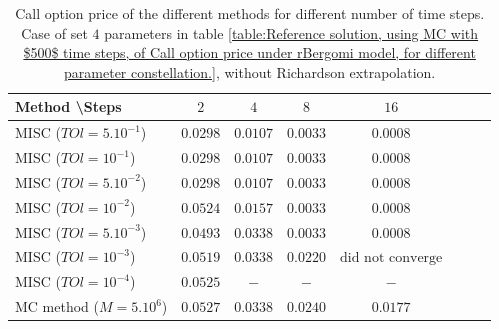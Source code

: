 \documentclass[11pt]{article}
\begin{document}
\begin{table}[h!]
\centering
\begin{tabular}{l*{6}{c}r}
Method \textbackslash  Steps            & $2$ & $4$ & $8$ & $16$ &   \\
\hline
MISC ($TOl=5.10^{-1}$)  & $0.0298$ & $0.0107$ & $0.0033$ & $0.0008$  \\
MISC ($TOl=10^{-1}$)  & $0.0298$ & $0.0107$ & $0.0033$ & $0.0008$   \\
MISC ($TOl=5.10^{-2}$)  &$0.0298$ & $0.0107$ & $0.0033$ & $0.0008$  \\
MISC ($TOl=10^{-2}$)  & $0.0524$ & $0.0157$ & $0.0033$ & $0.0008$  \\
MISC ($TOl=5.10^{-3}$)  & $0.0493$ & $0.0338$  & $0.0033$ & $0.0008$\\
MISC ($TOl=10^{-3}$)  & $0.0519$ & $0.0338$ & $0.0220$ & $\text{did not converge}$  \\
MISC ($TOl=10^{-4}$)  & $0.0525$ &$-$ & $-$&$-$ \\
\hline
MC method ($M=5.10^{6}$)   & $    0.0527$ & $0.0338$  & $ 0.0240$ & $  0.0177$ \\		

\hline
\end{tabular}
\caption{ Call option price of the different methods for different number of time steps. Case of set $4$ parameters in table \ref{table:Reference solution, using MC with $500$ time steps, of Call option price under rBergomi model, for different parameter constellation.}, without Richardson extrapolation.}
\label{table: Call option price of the different methods for different number of time steps. Case set 4}
\end{table}
\end{document}
